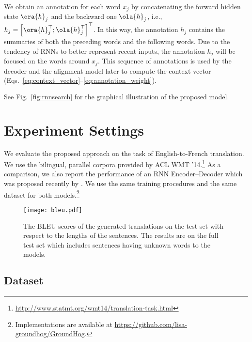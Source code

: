 We obtain an annotation for each word $x_j$ by concatenating the forward hidden
state $\ora{h}_j$ and the backward one $\ola{h}_j$, i.e., $h_j = \left[
\ora{h}_j^\top ; \ola{h}_j^\top \right]^\top$. In this way, the annotation $h_j$
contains the summaries of both the preceding words and the following words. Due
to the tendency of RNNs to better represent recent inputs, the annotation $h_j$
will be focused on the words around $x_j$. This sequence of annotations is used
by the decoder and the alignment model later to compute the context vector
(Eqs.~\eqref{eq:context_vector}--\eqref{eq:annotation_weight}).

See Fig.~\ref{fig:rnnsearch} for the graphical illustration of the proposed
model.

\section{Experiment Settings}
\label{sec:exp_settings}

We evaluate the proposed approach on the task of English-to-French translation.
We use the bilingual, parallel corpora provided by ACL WMT '14.\footnote{
    \url{http://www.statmt.org/wmt14/translation-task.html}
} As a comparison, we also report the performance of an RNN Encoder--Decoder
which was proposed recently by \citet{Cho2014}. We use the same training
procedures and the same dataset for both models.\footnote{
    Implementations are available at \url{https://github.com/lisa-groundhog/GroundHog}.
}

\begin{figure}[t]
    \centering
    \begin{minipage}{0.7\textwidth}
        \texttt{[image: bleu.pdf]}
    \end{minipage}
    \hfill
    \begin{minipage}[t!]{0.29\textwidth}
        \caption{
            The BLEU scores of the generated translations on the test set with
            respect to the lengths of the sentences. The results are on the full
            test set which includes sentences having unknown words to the
            models.
        }
        \label{fig:bleu_length}
    \end{minipage}
\end{figure}

\subsection{Dataset}

